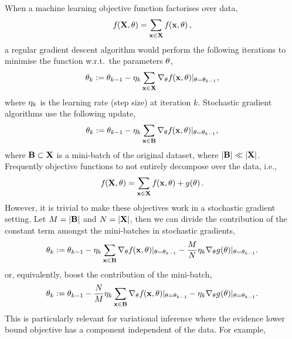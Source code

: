 \documentclass[11pt, oneside]{article}
\begin{document}
When a machine learning objective function factorises over data,
\begin{equation}
    {f}_{}\!\left({{\mathbf{X}, \theta}}\right) = \sum_{\mathbf{x} \in \mathbf{X}} {f}_{}\!\left({{\mathbf{x}, \theta}}\right),
\end{equation}
a regular gradient descent algorithm would perform the following iterations to
minimise the function w.r.t.\ the parameters $\theta$,
\begin{equation}
    \theta_k := \theta_{k-1} - \eta_k \sum_{\mathbf{x} \in \mathbf{X}}
    \nabla_{\theta} {f}_{}\!\left({{\mathbf{x}, \theta}}\right)\!|_{\theta = \theta_{k-1}},
\end{equation}
where $\eta_k$ is the learning rate (step size) at iteration $k$. Stochastic
gradient algorithms use the following update,
\begin{equation}
    \theta_k := \theta_{k-1} - \eta_k \sum_{\mathbf{x} \in \mathbf{B}}
    \nabla_{\theta} {f}_{}\!\left({{\mathbf{x}, \theta}}\right)\!|_{\theta = \theta_{k-1}},
    \label{eq:sg}
\end{equation}
where $\mathbf{B} \subset \mathbf{X}$ is a mini-batch of the original dataset, where
$|\mathbf{B}| \ll |\mathbf{X}|$. Frequently objective functions to not entirely
decompose over the data, i.e.,
\begin{equation}
    {f}_{}\!\left({{\mathbf{X}, \theta}}\right) = \sum_{\mathbf{x} \in \mathbf{X}} {f}_{}\!\left({{\mathbf{x}, \theta}}\right)
    + {g}_{}\!\left({{\theta}}\right).
    \label{eq:objwconst}
\end{equation}
However, it is trivial to make these objectives work in a stochastic gradient
setting. Let $M = |\mathbf{B}|$ and $N = |\mathbf{X}|$, then we can divide the
contribution of the constant term amongst the mini-batches in stochastic 
gradients,
\begin{equation}
    \theta_k := \theta_{k-1} - \eta_k \sum_{\mathbf{x} \in \mathbf{B}}
    \nabla_{\theta} {f}_{}\!\left({{\mathbf{x}, \theta}}\right)\!|_{\theta = \theta_{k-1}}
    - \frac{M}{N} \eta_k \nabla_{\theta} 
    {g}_{}\!\left({{\theta}}\right)\!|_{\theta = \theta_{k-1}}.
    \label{eq:wsg}
\end{equation} 
or, equivalently, boost the contribution of the mini-batch,
\begin{equation}
    \theta_k := \theta_{k-1} - \frac{N}{M} \eta_k \sum_{\mathbf{x} \in \mathbf{B}}
    \nabla_{\theta} {f}_{}\!\left({{\mathbf{x}, \theta}}\right)\!|_{\theta = \theta_{k-1}}
    - \eta_k \nabla_{\theta} 
    {g}_{}\!\left({{\theta}}\right)\!|_{\theta = \theta_{k-1}}.
    \label{eq:wsg2}
\end{equation} 
This is particularly relevant for variational inference where the evidence
lower bound objective has a component independent of the data. For example, 
\end{document}
